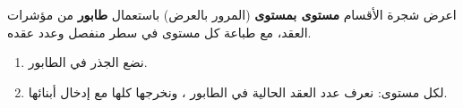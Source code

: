 \begin{statement}
اعرض شجرة الأقسام \textbf{مستوى بمستوى} (المرور بالعرض) باستعمال \textbf{طابور} من مؤشرات العقد، مع طباعة كل مستوى في سطر منفصل وعدد عقده.
\end{statement}
\begin{stepsbox}\begin{enumerate}
\item نضع الجذر في الطابور.
\item لكل مستوى: نعرف عدد العقد الحالية في الطابور ، ونخرجها كلها مع إدخال أبنائها.
\end{enumerate}\end{stepsbox}
